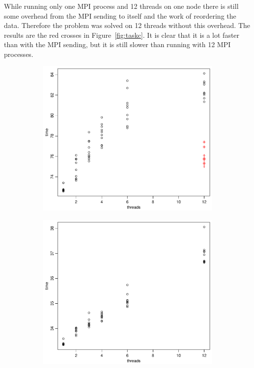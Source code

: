 While running only one MPI process and 12 threads on one node there is still some overhead from the MPI sending to itself and the work of reordering the data. Therefore the problem was solved on 12 threads without this overhead. The results are the red crosses in Figure~\ref{fig:taskc}. It is clear that it is a lot faster than with the MPI sending, but it is still slower than running with 12 MPI processes. 
\\
\begin{figure}[h!]
  \centering
  \begin{subfigure}[b]{0.48\textwidth}
    \includegraphics[width=\textwidth]{./Figures/taskc1.pdf}
  \end{subfigure}%
  \quad
  \begin{subfigure}[b]{0.48\textwidth}
    \includegraphics[width=\textwidth]{./Figures/taskc2.pdf}

\end{subfigure}
\end{figure}

